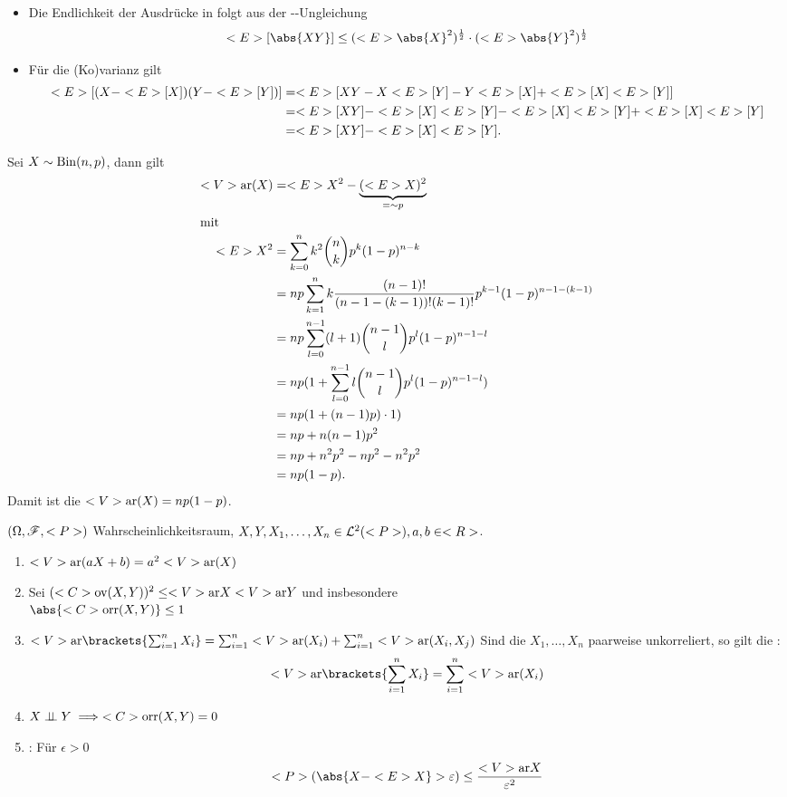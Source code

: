 \begin{*remark}
	\begin{itemize}
		\item Die Endlichkeit der Ausdrücke in  folgt aus der --Ungleichung
		\[
		\E[\abs{XY}] \le (\E\abs{X}^2)^{\frac{1}{2}}\cdot (\E\abs{Y}^2)^{\frac{1}{2}}
		\]
		\item Für die (Ko)varianz gilt
		\begin{align*}
			<E>[(X -<E>[X])(Y-<E>[Y])] &= <E>[XY - X<E>[Y] - Y<E>[X] + <E>[X]<E>[Y]]\\
			&= <E>[XY] - <E>[X]<E>[Y] - <E>[X]<E>[Y] + <E>[X]<E>[Y]\\
			&= <E>[XY] - <E>[X]<E>[Y].
		\end{align*}
	\end{itemize}
\end{*remark}
\begin{example}
	Sei $X\sim\operatorname{Bin}(n,p)$, dann gilt
	\begin{align*}
		<V>\text{ar}(X) &= <E> X^2 - \underbrace{(<E> X)^2}_{=\sim p}\\
		\intertext{mit}
		<E> X^2 &= \sum_{k=0}^n k^2 \binom{n}{k}p^k (1-p)^{n-k}\\
		&= np \sum_{k=1}^n k \frac{(n-1)!}{(n-1-(k-1))!(k-1)!} p^{k-1}(1-p)^{n-1-(k-1)}\\
		&= np\sum_{l=0}^{n-1}(l+1)\binom{n-1}{l}p^l (1-p)^{n-1-l}\\
		&= np(1 + \sum_{l=0}^{n-1}l \binom{n-1}{l}p^l (1-p)^{n-1-l})\\
		&= np(1+(n-1)p)\cdot 1)\\
		&= np + n(n-1)p^2\\
		&= np + n^2p^2 - np^2 - n^2p^2\\
		&= np(1-p). 
	\end{align*}
	Damit ist die $<V>\text{ar}(X) = np(1-p)$.
\end{example}
\begin{proposition}
	$(\Omega,\mathscr F,<P>)$ Wahrscheinlichkeitsraum, $X,Y, X_1, \dots, X_n \in \mathcal{L}^{2}(<P>), a,b \in <R>$.
	\begin{enumerate}
		\item $<V>\text{ar}(aX + b) = a^2<V>\text{ar}(X)$
		\item  Sei $(<C>\text{ov}(X,Y))^2 \le <V>\text{ar} X <V>\text{ar} Y$ und insbesondere\\
		$\abs{\Corr(X,Y)} \le 1$
		\item $\Var\brackets{\sum_{i=1}^n X_i} = \sum_{i=1}^n \Var(X_i) + \sum_{i=1}^n \Var(X_i,X_j)$ Sind die $X_1, \dots, X_n$ paarweise unkorreliert, so gilt die :
		\[
			\Var\brackets{\sum_{i=1}^n X_i} = \sum_{i=1}^n \Var(X_i)
		\]
		\item $X \perp\!\!\!\perp Y \implies <C>\text{orr}(X,Y) = 0$
		\item {}: Für $\epsilon > 0$
		\[
			\P(\abs{X - \E X} > \epsilon) \le \frac{\Var X}{\epsilon^2}
		\]
	\end{enumerate}
\end{proposition}
